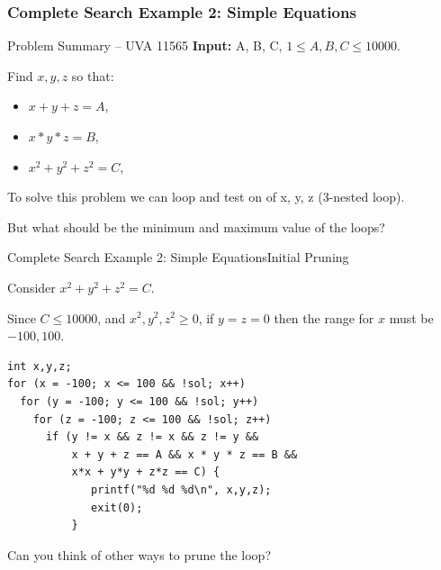 \begin{frame}
  \frametitle{Complete Search Example 2: Simple Equations}
  \begin{block}{Problem Summary -- UVA 11565}
    {\bf Input:} A, B, C, $1 \leq A,B,C \leq 10000$.\bigskip

    Find $x,y,z$ so that:
    \begin{itemize}
    \item $x+y+z=A$,
    \item $x*y*z=B$,
    \item $x^2+y^2+z^2=C$,
    \end{itemize}

    \bigskip
  \end{block}
  \bigskip

  To solve this problem we can loop and test on of x, y, z (3-nested loop).
  \bigskip

  But what should be the minimum and maximum value of the loops?
\end{frame}


\begin{frame}[fragile]{Complete Search Example 2: Simple Equations}{Initial Pruning}
  \begin{block}{}
    Consider $x^2 + y^2 + z^2 = C$.\medskip

    Since $C \leq 10000$, and $x^2,y^2,z^2 \geq 0$, if $y =
    z = 0$ then the range for $x$ must be $-100, 100$.
  \end{block}

{\smaller
\begin{verbatim}
int x,y,z;
for (x = -100; x <= 100 && !sol; x++)
  for (y = -100; y <= 100 && !sol; y++)
    for (z = -100; z <= 100 && !sol; z++)
      if (y != x && z != x && z != y &&
          x + y + z == A && x * y * z == B &&
          x*x + y*y + z*z == C) {
             printf("%d %d %d\n", x,y,z);
             exit(0);
          }
\end{verbatim}}

\begin{block}{}
  Can you think of other ways to prune the loop?


\end{block}
\end{frame}

